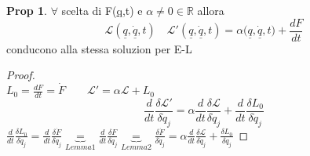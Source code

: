 \documentclass[a4paper,11pt]{report}
\theoremstyle{remark}
\theoremstyle{definition}
\newtheorem*{prop}{Prop}
\begin{document}
\begin{prop}
	$\forall$ scelta di F(\underline{q},t) e $\alpha \ne 0 \in \mathbb{R}$ allora 
	\[\mathcal{L}(\underline{q},\underline{\dot{q}},t) \quad \mathcal{L}' (\underline{q},\underline{\dot{q}},t) = \alpha \mathcal
	(\underline{q},\underline{\dot{q}},t) + \frac{dF}{dt}\]
	conducono alla stessa soluzion per E-L
\end{prop}

\begin{proof}\hfill\\
	$L_0 = \frac{dF}{dt} = \dot{F} \qquad \mathcal{L}' = \alpha\mathcal{L}+ L_0$
	\[\frac{d}{dt}\frac{\delta\mathcal{L}'}{\delta \dot{q}_j} = \alpha \frac{d}{dt}\frac{\delta\mathcal{L}}{\delta \dot{q}_j} + \frac{d}{dt}\frac{\delta L_0}{\delta \dot{q}_j}\]	
	$\frac{d}{dt}\frac{\delta L_0}{\delta \dot{q}_j} = \frac{d}{dt}\frac{\delta \dot{F}}{\delta \dot{q}_j} \underbrace{=}_{Lemma 1} \frac{d}{dt}\frac{\delta F}{\delta q_j} \underbrace{=}_{Lemma 2} \frac{\delta \dot{F}}{\delta \dot{q}_j} = \alpha \frac{d}{dt}\frac{\delta \mathcal{L}}{\delta \dot{q}_j} + \frac{\delta L_0}{\delta q_j}$
\end{proof}
\end{document}
